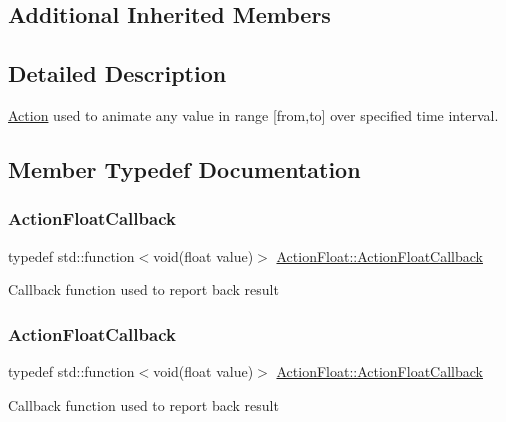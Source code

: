 \subsection*{Additional Inherited Members}


\subsection{Detailed Description}
\hyperlink{classAction}{Action} used to animate any value in range \mbox{[}from,to\mbox{]} over specified time interval. 

\subsection{Member Typedef Documentation}
\mbox{\label{classActionFloat_a47a1fbc750167a8f9d754c62a62eaafa}} 
\subsubsection{\texorpdfstring{Action\+Float\+Callback}{ActionFloatCallback}\hspace{0.1cm}{\footnotesize\ttfamily [1/2]}}
{\footnotesize\ttfamily typedef std\+::function$<$void(float value)$>$ \hyperlink{classActionFloat_a47a1fbc750167a8f9d754c62a62eaafa}{Action\+Float\+::\+Action\+Float\+Callback}}

Callback function used to report back result \mbox{\label{classActionFloat_a47a1fbc750167a8f9d754c62a62eaafa}} 
\subsubsection{\texorpdfstring{Action\+Float\+Callback}{ActionFloatCallback}\hspace{0.1cm}{\footnotesize\ttfamily [2/2]}}
{\footnotesize\ttfamily typedef std\+::function$<$void(float value)$>$ \hyperlink{classActionFloat_a47a1fbc750167a8f9d754c62a62eaafa}{Action\+Float\+::\+Action\+Float\+Callback}}

Callback function used to report back result 

